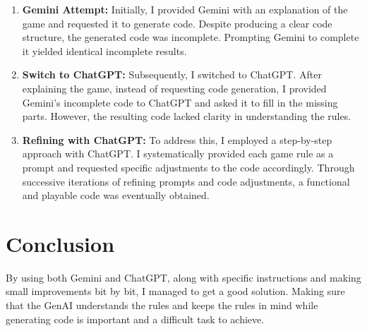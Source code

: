 \documentclass{article}
\begin{document}
\begin{enumerate}
    \item \textbf{Gemini Attempt:} Initially, I provided Gemini with an explanation of the game and requested it to generate code. Despite producing a clear code structure, the generated code was incomplete. Prompting Gemini to complete it yielded identical incomplete results.
    \item \textbf{Switch to ChatGPT:} Subsequently, I switched to ChatGPT. After explaining the game, instead of requesting code generation, I provided Gemini's incomplete code to ChatGPT and asked it to fill in the missing parts. However, the resulting code lacked clarity in understanding the rules.
    \item \textbf{Refining with ChatGPT:} To address this, I employed a step-by-step approach with ChatGPT. I systematically provided each game rule as a prompt and requested specific adjustments to the code accordingly. Through successive iterations of refining prompts and code adjustments, a functional and playable code was eventually obtained.
\end{enumerate}

\section{Conclusion}

By using both Gemini and ChatGPT, along with specific instructions and making small improvements bit by bit, I managed to get a good solution. Making sure that the GenAI understands the rules and keeps the rules in mind while generating code is important and a difficult task to achieve.
\end{document}
